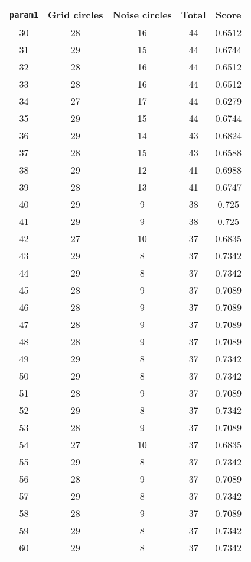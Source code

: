 \documentclass[letterpaper, 12pt]{article}
\begin{document}
\begin{longtable}{|c|c|c|c|c|}
\hline
\textbf{\texttt{param1}} & \textbf{Grid circles} & \textbf{Noise circles} & \textbf{Total} & \textbf{Score} \\
\hline
30 & 28 & 16 & 44 & 0.6512 \\
\hline
31 & 29 & 15 & 44 & 0.6744 \\
\hline
32 & 28 & 16 & 44 & 0.6512 \\
\hline
33 & 28 & 16 & 44 & 0.6512 \\
\hline
34 & 27 & 17 & 44 & 0.6279 \\
\hline
35 & 29 & 15 & 44 & 0.6744 \\
\hline
36 & 29 & 14 & 43 & 0.6824 \\
\hline
37 & 28 & 15 & 43 & 0.6588 \\
\hline
38 & 29 & 12 & 41 & 0.6988 \\
\hline
39 & 28 & 13 & 41 & 0.6747 \\
\hline
40 & 29 & 9 & 38 & 0.725 \\
\hline
41 & 29 & 9 & 38 & 0.725 \\
\hline
42 & 27 & 10 & 37 & 0.6835 \\
\hline
43 & 29 & 8 & 37 & 0.7342 \\
\hline
44 & 29 & 8 & 37 & 0.7342 \\
\hline
45 & 28 & 9 & 37 & 0.7089 \\
\hline
46 & 28 & 9 & 37 & 0.7089 \\
\hline
47 & 28 & 9 & 37 & 0.7089 \\
\hline
48 & 28 & 9 & 37 & 0.7089 \\
\hline
49 & 29 & 8 & 37 & 0.7342 \\
\hline
50 & 29 & 8 & 37 & 0.7342 \\
\hline
51 & 28 & 9 & 37 & 0.7089 \\
\hline
52 & 29 & 8 & 37 & 0.7342 \\
\hline
53 & 28 & 9 & 37 & 0.7089 \\
\hline
54 & 27 & 10 & 37 & 0.6835 \\
\hline
55 & 29 & 8 & 37 & 0.7342 \\
\hline
56 & 28 & 9 & 37 & 0.7089 \\
\hline
57 & 29 & 8 & 37 & 0.7342 \\
\hline
58 & 28 & 9 & 37 & 0.7089 \\
\hline
59 & 29 & 8 & 37 & 0.7342 \\
\hline
60 & 29 & 8 & 37 & 0.7342 \\
\hline

\end{longtable}
\end{document}
